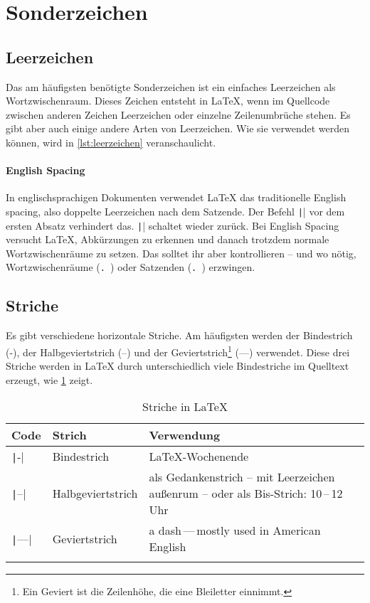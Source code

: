\section{Sonderzeichen}
\label{sec:sonderzeichen}

\subsection{Leerzeichen}

Das am häufigsten benötigte Sonderzeichen ist ein einfaches Leerzeichen als Wortzwischenraum.
Dieses Zeichen entsteht in \LaTeX, wenn im Quellcode zwischen anderen Zeichen Leerzeichen oder einzelne Zeilenumbrüche stehen.
Es gibt aber auch einige andere Arten von Leerzeichen.
Wie sie verwendet werden können, wird in \cref{lst:leerzeichen} veranschaulicht.


\paragraph{English Spacing}
In englischsprachigen Dokumenten verwendet LaTeX das traditionelle English spacing, also doppelte Leerzeichen nach dem Satzende.
Der Befehl \texttt|\frenchspacing| vor dem ersten Absatz verhindert das.
\texttt|\nonfrenchspacing| schaltet wieder zurück.
Bei English Spacing versucht \LaTeX, Abkürzungen zu erkennen und danach trotzdem normale Wortzwischenräume zu setzen.
Das solltet ihr aber kontrollieren – und wo nötig,
Wortzwischenräume (\texttt{.\ }) oder Satzenden (\texttt{\@. }) erzwingen.

\subsection{Striche}
Es gibt verschiedene horizontale Striche.
Am häufigsten werden der Bindestrich (-), der Halbgeviertstrich (–) und der Geviertstrich\footnote{Ein Geviert ist die Zeilenhöhe, die eine Bleiletter einnimmt.} (—) verwendet.
Diese drei Striche werden in \LaTeX{} durch unterschiedlich viele Bindestriche im Quelltext erzeugt, wie \cref{tbl:striche} zeigt.

\begin{longtable}{@{}llp{7.8cm}@{}}
	\toprule
	Code       & Strich            & Verwendung \\
	\midrule
	\texttt|-|   & Bindestrich       & \LaTeX-Wochenende \\
	\texttt|--|  & Halbgeviertstrich & als Gedankenstrich – mit Leerzeichen außenrum – oder als Bis-Strich: 10\,–\,12 Uhr \\
	\texttt|---| & Geviertstrich     & a dash\,—\,mostly used in American English \\
	\bottomrule
	\caption{Striche in \LaTeX}
	\label{tbl:striche}
\end{longtable}

